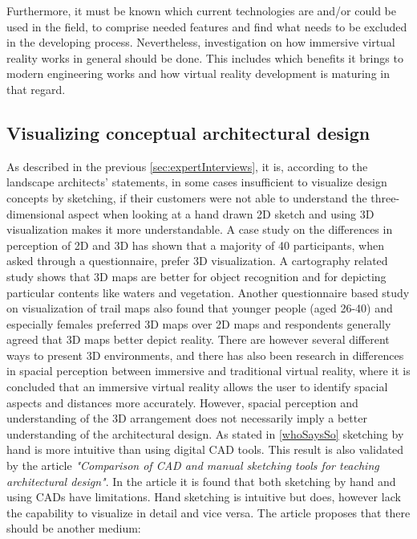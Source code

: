		Furthermore, it must be known which current technologies are and/or could be used in the field, to comprise needed features and find what needs to be excluded in the developing process. Nevertheless, investigation on how immersive virtual reality works in general should be done. This includes which benefits it brings to modern engineering works and how virtual reality development is maturing in that regard.		
			
	
			\subsection{Visualizing conceptual architectural design}
			\label{sec:immersion}
			As described in the previous \autoref{sec:expertInterviews}, it is, according to the landscape architects' statements, in some cases insufficient to visualize design concepts by sketching, if their customers were not able to understand the three-dimensional aspect when looking at a hand drawn 2D sketch and using 3D visualization makes it more understandable. A case study on the differences in perception of 2D and 3D\cite{2Dvs3D} has shown that a majority of 40 participants, when asked through a  questionnaire, prefer 3D visualization. A cartography related study shows that 3D maps are better for object recognition and for depicting particular contents like waters and vegetation\cite{2Dvs3DobjectRecognition}. Another questionnaire based study on visualization of trail maps also found that younger people (aged 26-40) and especially females preferred 3D maps over 2D maps\cite{2Dvs3DtrailMaps} and respondents generally agreed that 3D maps better depict reality. There are however several different ways to present 3D environments, and there has also been research in differences in spacial perception between immersive and traditional virtual reality\cite{immersive3DModel}, where it is concluded that an immersive virtual reality allows the user to identify spacial aspects and distances more accurately. However, spacial perception and understanding of the 3D arrangement does not necessarily imply a better understanding of the architectural design. As stated in \autoref{whoSaysSo} sketching by hand is more intuitive than using digital CAD tools. This result is also validated by the article \textit{"Comparison of CAD and manual sketching tools for teaching architectural design"}\cite{sketchingVsCAD}. In the article it is found that both sketching by hand and using CADs have limitations. Hand sketching is intuitive but does, however lack the capability to visualize in detail and vice versa. The article proposes that there should be another medium:\\
			
